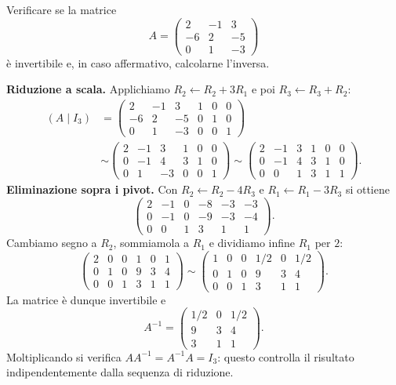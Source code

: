 \begin{esercizio}
Verificare se la matrice
\[
 A=\begin{pmatrix}2&-1&3\\-6&2&-5\\0&1&-3\end{pmatrix}
\]
è invertibile e, in caso affermativo, calcolarne l'inversa.
\end{esercizio}
\begin{svolgimento}
\textbf{Riduzione a scala.} Applichiamo $R_2\leftarrow R_2+3R_1$ e poi $R_3\leftarrow R_3+R_2$:
\begin{align*}
 (A\mid I_3)&=
 \left(\begin{array}{rrr|rrr}2&-1&3&1&0&0\\-6&2&-5&0&1&0\\0&1&-3&0&0&1\end{array}\right)\\
 &\sim\left(\begin{array}{rrr|rrr}2&-1&3&1&0&0\\0&-1&4&3&1&0\\0&1&-3&0&0&1\end{array}\right)
 \sim\left(\begin{array}{rrr|rrr}2&-1&3&1&0&0\\0&-1&4&3&1&0\\0&0&1&3&1&1\end{array}\right).
\end{align*}
\textbf{Eliminazione sopra i pivot.} Con $R_2\leftarrow R_2-4R_3$ e $R_1\leftarrow R_1-3R_3$ si ottiene
\[
 \left(\begin{array}{rrr|rrr}2&-1&0&-8&-3&-3\\0&-1&0&-9&-3&-4\\0&0&1&3&1&1\end{array}\right).
\]
Cambiamo segno a $R_2$, sommiamola a $R_1$ e dividiamo infine $R_1$ per $2$:
\[
 \left(\begin{array}{rrr|rrr}2&0&0&1&0&1\\0&1&0&9&3&4\\0&0&1&3&1&1\end{array}\right)
 \sim\left(\begin{array}{rrr|rrr}1&0&0&1/2&0&1/2\\0&1&0&9&3&4\\0&0&1&3&1&1\end{array}\right).
\]
La matrice è dunque invertibile e
\[
 A^{-1}=\begin{pmatrix}1/2&0&1/2\\9&3&4\\3&1&1\end{pmatrix}.
\]
Moltiplicando si verifica $AA^{-1}=A^{-1}A=I_3$: questo controlla il risultato indipendentemente dalla sequenza di riduzione.
\end{svolgimento}
